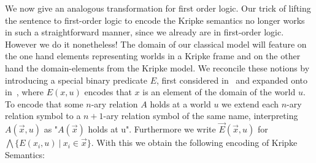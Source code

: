 \documentclass[runningheads]{llncs}
\begin{document}
We now give an analogous transformation for first order logic. Our trick of lifting the sentence to first-order logic to encode the Kripke semantics no longer works in such a straightforward manner, since we already are in first-order logic. However we do it nonetheless! The domain of our classical model will feature on the one hand elements representing worlds in a Kripke frame and on the other hand the domain-elements from the Kripke model. We reconcile these notions by introducing a special binary predicate $E$, first considered in~\cite{baaz2006skolemization} and expanded onto in~\cite{iemhoff2010eskolemization}, where $E(x, u)$ encodes that $x$ is an element of the domain of the world $u$. To encode that some $n$-ary relation $A$ holds at a world $u$ we extend each $n$-ary relation symbol to a $n+1$-ary relation symbol of the same name, interpreting $A(\vec x, u)$ as "$A(\vec x)$ holds at u". Furthermore we write $\vec E(\vec x, u)$ for $\bigwedge\{E(x_i, u)\:|\:x_i\in \vec x\}$. With this we obtain the following encoding of Kripke Semantics:
\end{document}
